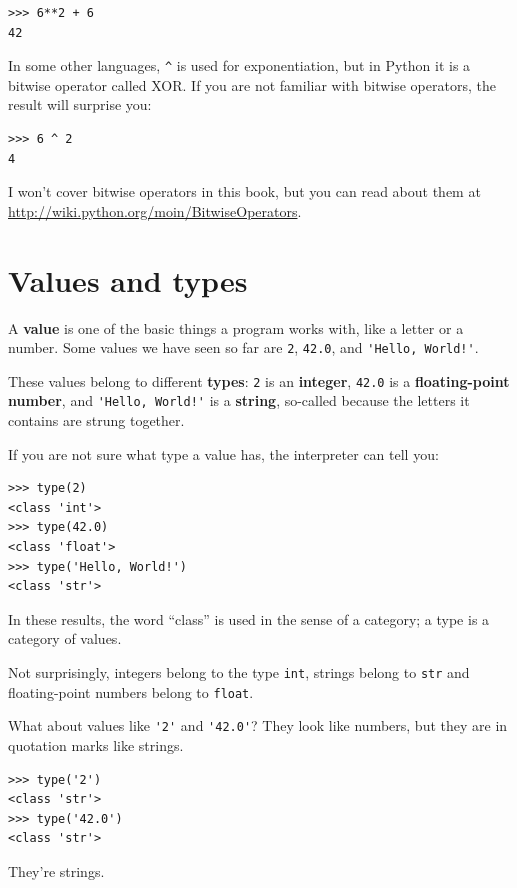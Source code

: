 \documentclass[10pt]{book}
\begin{document}
\begin{verbatim}
>>> 6**2 + 6
42
\end{verbatim}
%
In some other languages, \verb"^" is used for exponentiation, but
in Python it is a bitwise operator called XOR.  If you are not
familiar with bitwise operators, the result will surprise you:

\begin{verbatim}
>>> 6 ^ 2
4
\end{verbatim}
%
I won't cover
bitwise operators in this book, but you can read about
them at \url{http://wiki.python.org/moin/BitwiseOperators}.


\section{Values and types}

A {\bf value} is one of the basic things a program works with, like a
letter or a number.  Some values we have seen so far are {\tt 2},
{\tt 42.0}, and \verb"'Hello, World!'".

These values belong to different {\bf types}:
{\tt 2} is an {\bf integer}, {\tt 42.0} is a {\bf floating-point number},
and \verb"'Hello, World!'" is a {\bf string},
so-called because the letters it contains are strung together.

If you are not sure what type a value has, the interpreter can
tell you:

\begin{verbatim}
>>> type(2)
<class 'int'>
>>> type(42.0)
<class 'float'>
>>> type('Hello, World!')
<class 'str'>
\end{verbatim}
%
In these results, the word ``class'' is used in the sense of
a category; a type is a category of values.

Not surprisingly, integers belong to the type {\tt int},
strings belong to {\tt str} and floating-point
numbers belong to {\tt float}.  

What about values like \verb"'2'" and \verb"'42.0'"?
They look like numbers, but they are in quotation marks like
strings.

\begin{verbatim}
>>> type('2')
<class 'str'>
>>> type('42.0')
<class 'str'>
\end{verbatim}
%
They're strings.
\end{document}
